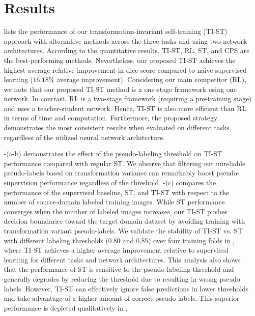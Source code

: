 \section{Results}
\label{sec:experimental_results_tist}



 lists the performance of our transformation-invariant self-training (TI-ST) approach with alternative methods across the three tasks and using two network architectures. According to the quantitative results, TI-ST, RL, ST, and CPS are the best-performing methods. Nevertheless, our proposed TI-ST achieves the highest average relative improvement in dice score compared to naive supervised learning ($16.18\%$ average improvement). Considering our main competitor (RL), we note that our proposed TI-ST method is a one-stage framework using one network. In contrast, RL is a two-stage framework (requiring a pre-training stage) and uses a teacher-student network. Hence, TI-ST is also more efficient than RL in terms of time and computation.  Furthermore, the proposed strategy demonstrates the most consistent results when evaluated on different tasks, regardless of the utilized neural network architecture. 


-(a-b) demonstrates the effect of the pseudo-labeling threshold on TI-ST performance compared with regular ST. We observe that filtering out unreliable pseudo-labels based on transformation variance can remarkably boost pseudo-supervision performance regardless of the threshold. -(c) compares the performance of the supervised baseline, ST, and TI-ST with respect to the number of source-domain labeled training images. While ST performance converges when the number of labeled images increases, our TI-ST pushes decision boundaries toward the target domain dataset by avoiding training with transformation variant pseudo-labels. We validate the stability of TI-ST vs. ST  with different labeling thresholds (0.80 and 0.85) over four training folds in , where TI-ST achieves a higher average improvement relative to supervised learning for different tasks and network architectures. This analysis also shows that the performance of ST is sensitive to the pseudo-labeling threshold and generally degrades by reducing the threshold due to resulting in wrong pseudo labels. However, TI-ST can effectively ignore false predictions in lower thresholds and take advantage of a higher amount of correct pseudo labels. This superior performance is depicted qualitatively in .


